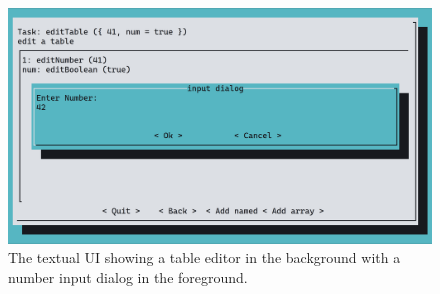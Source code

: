 \begin{figure}
    \centering
    \includegraphics[width=\textwidth]{img/screenshot-ltui.png}
    \caption{The textual UI showing a table editor in the background with a number input dialog in the foreground.}
    \label{fig:ltask_ui}
\end{figure}
